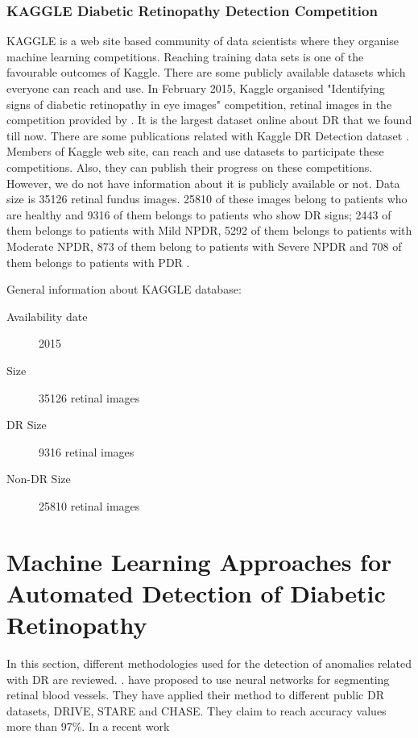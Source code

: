 \subsubsection{KAGGLE Diabetic Retinopathy Detection Competition}
KAGGLE is a web site based community of data scientists where they organise machine learning competitions. Reaching training data sets is one of the favourable outcomes of Kaggle. There are some publicly available datasets which everyone can reach and use. In February 2015, Kaggle organised "Identifying signs of diabetic retinopathy in eye images" competition, retinal images in the competition provided by \citet{eyePACS}. It is the largest dataset online about DR that we found till now. There are some publications related with Kaggle DR Detection dataset \citep{albanautomated} \citep{van2016fast}. Members of Kaggle web site, can reach and use datasets to participate these competitions. Also, they can publish their progress on these competitions. However, we do not have information about it is publicly available or not. Data size is 35126 retinal fundus images\citep{van2016fast}. 25810 of these images belong to patients who are healthy and 9316 of them belongs to patients who show DR signs; 2443 of them belongs to patients with Mild NPDR, 5292 of them belongs to patients with Moderate NPDR, 873 of them belong to patients with Severe NPDR and 708 of them belongs to patients with PDR \citep{albanautomated}. 


General information about KAGGLE database:
\begin{description}
    \item[Availability date] 2015
    \item[Size] 35126 retinal images
    \item[DR Size] 9316 retinal images
    \item[Non-DR Size] 25810 retinal images
\end{description}

\section{Machine Learning Approaches for Automated Detection of Diabetic Retinopathy}
In this section, different methodologies used for the detection of anomalies related with DR are reviewed. \citep{liskowski2016segmenting, elbalaoui2016automatic}. 
\citet{liskowski2016segmenting} have proposed to use neural networks for segmenting retinal blood vessels. They have applied their method to different public DR datasets, DRIVE, STARE and CHASE. They claim to reach accuracy values more than 97\%. 
In a recent work 

